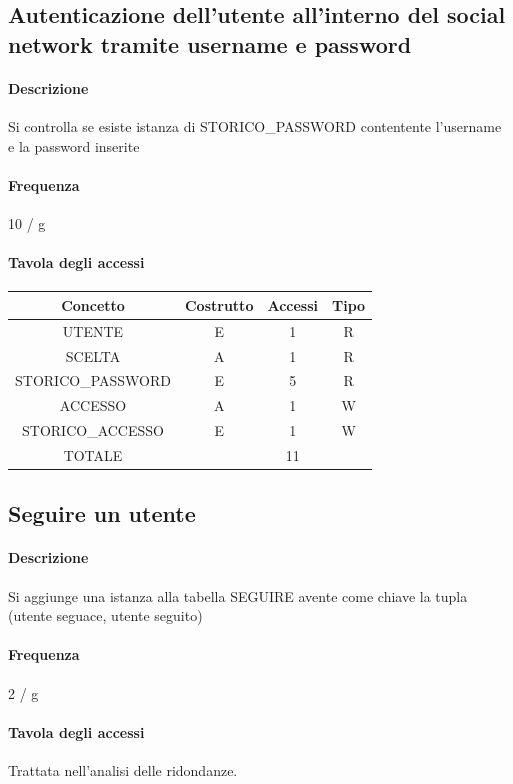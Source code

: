 \documentclass[a4paper,12pt]{report}
\begin{document}
\subsection{Autenticazione dell'utente all'interno del social network tramite username e password} \label{autenticazione}
\paragraph{Descrizione} Si controlla se esiste istanza di STORICO\_PASSWORD contentente l'username e la password inserite
\paragraph{Frequenza} 10 / g
\begin{table}[H]
\paragraph{Tavola degli accessi\newline}
\begin{tabular}{|c|c|c|c|}
\hline
Concetto          & Costrutto & Accessi & Tipo \\ \hline
UTENTE            & E         & 1       & R    \\ \hline
SCELTA            & A         & 1       & R    \\ \hline
STORICO\_PASSWORD & E         & 5       & R    \\ \hline
ACCESSO           & A         & 1       & W    \\ \hline
STORICO\_ACCESSO  & E         & 1       & W    \\ \hline
TOTALE            &           & 11      &      \\ \hline
\end{tabular}
\end{table}
\subsection{Seguire un utente} \label{follow}
\paragraph{Descrizione} Si aggiunge una istanza alla tabella SEGUIRE avente come chiave la tupla (utente seguace, utente seguito)
\paragraph{Frequenza} 2 / g
\paragraph{Tavola degli accessi}
Trattata nell'analisi delle ridondanze.
\end{document}
